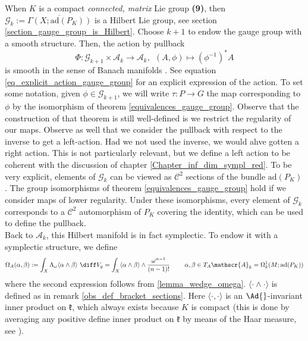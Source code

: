 {When \(K\) is a compact \textit{connected, matrix} Lie group \textbf{(9)}, then \(\mathscr{G}_k:=\overline{\Gamma(X; \mathrm{ad}(P_K))}\) is a Hilbert Lie group, see section \ref{section_gauge_group_is_Hilbert}. Choose \(k+1\) to endow the gauge group with a smooth structure. Then, the action by pullback 
\begin{equation} \label{eq_def_action_Phi}
    \Phi: \mathscr{G}_{k+1} \times \mathscr{A}_k \longrightarrow  \mathscr{A}_k, \ \  (A, \phi) \mapsto (\phi^{-1})^*A 
\end{equation}
is smooth in the sense of Banach manifolds \parencite[Prop. 3.12]{mitter1981bundle}. See equation \eqref{eq_explicit_action_gauge_group} for an explicit expression of the action. To set some notation, given \(\phi \in \mathscr{G}_{k+1}\), we will write \(\tau\colon P \to G\) the map corresponding to \(\phi\) by the isomorphism of theorem \ref{equivalences_gauge_group}. Observe that the construction of that theorem is still well-defined is we restrict the regularity of our maps. Observe as well that we consider the pullback with respect to the inverse to get a left-action. Had we not used the inverse, we would ahve gotten a right action. This is not particularly relevant, but we define a left action to be coherent with the discussion of chapter \ref{Chapter_inf_dim_sympl_red}. To be very explicit, elements of \(\mathscr{G}_k\) can be viewed as \(\mathscr{C}^{2}\) sections of the bundle \(\mathrm{ad}(P_K)\). The group isomorphisms of theorem \ref{equivalences_gauge_group} hold if we consider maps of lower regularity. Under these isomorphisms, every element of \(\mathscr{G}_k\) corresponds to a \(\mathscr{C}^{2}\) automorphism of \(P_K\) covering the identity, which can be used to define the pullback. \\

Back to \(\mathscr{A}_k\), this Hilbert manifold is in fact symplectic. To endow it with a symplectic structure, we define 
\begin{equation} \label{eq_def_sympl_form_connections}
\Omega_A(\alpha, \beta):=\int_X \Lambda_\omega\langle \alpha \wedge \beta \rangle \ \diff V_g = \int_X \langle \alpha \wedge \beta \rangle \wedge \frac{\omega^{n-1}}{(n-1)!} \hspace{0.8 cm} \alpha, \beta \in T_A \mathscr{A}_k = \Omega^1_k(M; \mathrm{ad}(P_K))
\end{equation}
where the second expression follows from \ref{lemma_wedge_omega}. \(\langle \cdot \wedge \cdot \rangle\) is defined as in remark \ref{obs_def_bracket_sections}. Here \(\langle \cdot, \cdot \rangle\) is an \(\Ad{}\)-invariant inner product on \(\mathfrak{k}\), which always exists because \(K\) is compact (this is done by averaging any positive define inner product on \(\mathfrak{k}\) by means of the Haar measure, see \parencite[Lemma 10.4.14]{hilgert2011structure}).

}
